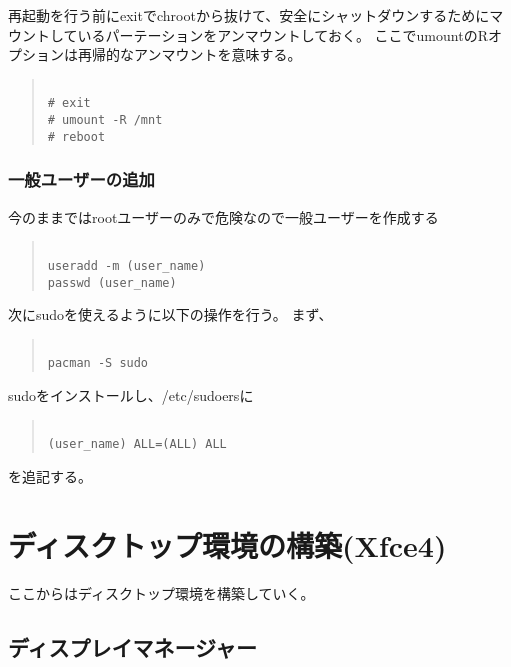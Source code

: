 \documentclass[dvipdfmx]{jsarticle}
\begin{document}
再起動を行う前にexitでchrootから抜けて、安全にシャットダウンするためにマウントしているパーテーションをアンマウントしておく。
ここでumountのRオプションは再帰的なアンマウントを意味する。

\begin{quote}
\begin{verbatim}

# exit  
# umount -R /mnt
# reboot

\end{verbatim}
\end{quote}

\subsubsection{一般ユーザーの追加}

今のままではrootユーザーのみで危険なので一般ユーザーを作成する

\begin{quote}
\begin{verbatim}

useradd -m (user_name)
passwd (user_name)

\end{verbatim}
\end{quote}

次にsudoを使えるように以下の操作を行う。
まず、

\begin{quote}
\begin{verbatim}

pacman -S sudo

\end{verbatim}
\end{quote}

sudoをインストールし、/etc/sudoersに

\begin{quote}
\begin{verbatim}

(user_name) ALL=(ALL) ALL

\end{verbatim}
\end{quote}

を追記する。

\section{ディスクトップ環境の構築(Xfce4)}

ここからはディスクトップ環境を構築していく。

\subsection{ディスプレイマネージャー}
\end{document}
